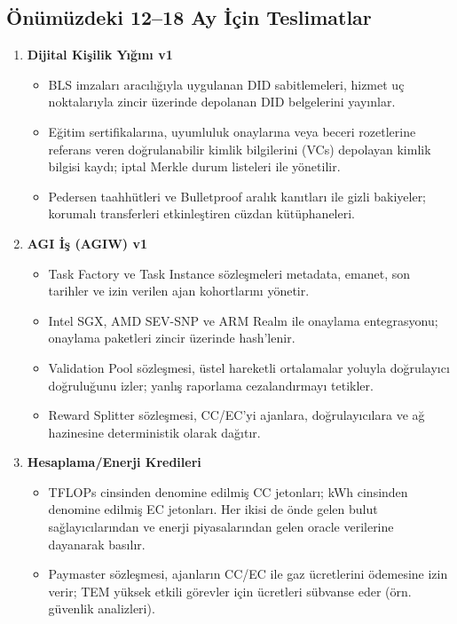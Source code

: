 \documentclass[11pt]{article}
\begin{document}
\subsection{Önümüzdeki 12--18 Ay İçin Teslimatlar}
\begin{enumerate}[label=\textbf{D\arabic*.}, leftmargin=*]
  \item \textbf{Dijital Kişilik Yığını v1}
  \begin{itemize}[noitemsep]
    \item BLS imzaları aracılığıyla uygulanan DID sabitlemeleri, hizmet uç noktalarıyla zincir üzerinde depolanan DID belgelerini yayınlar.
    \item Eğitim sertifikalarına, uyumluluk onaylarına veya beceri rozetlerine referans veren doğrulanabilir kimlik bilgilerini (VCs) depolayan kimlik bilgisi kaydı; iptal Merkle durum listeleri ile yönetilir.
    \item Pedersen taahhütleri ve Bulletproof aralık kanıtları ile gizli bakiyeler; korumalı transferleri etkinleştiren cüzdan kütüphaneleri.
  \end{itemize}
  \item \textbf{AGI İş (AGIW) v1}
  \begin{itemize}[noitemsep]
    \item Task Factory ve Task Instance sözleşmeleri metadata, emanet, son tarihler ve izin verilen ajan kohortlarını yönetir.
    \item Intel SGX, AMD SEV-SNP ve ARM Realm ile onaylama entegrasyonu; onaylama paketleri zincir üzerinde hash'lenir.
    \item Validation Pool sözleşmesi, üstel hareketli ortalamalar yoluyla doğrulayıcı doğruluğunu izler; yanlış raporlama cezalandırmayı tetikler.
    \item Reward Splitter sözleşmesi, CC/EC'yi ajanlara, doğrulayıcılara ve ağ hazinesine deterministik olarak dağıtır.
  \end{itemize}
  \item \textbf{Hesaplama/Enerji Kredileri}
  \begin{itemize}[noitemsep]
    \item TFLOPs cinsinden denomine edilmiş CC jetonları; kWh cinsinden denomine edilmiş EC jetonları. Her ikisi de önde gelen bulut sağlayıcılarından ve enerji piyasalarından gelen oracle verilerine dayanarak basılır.
    \item Paymaster sözleşmesi, ajanların CC/EC ile gaz ücretlerini ödemesine izin verir; TEM yüksek etkili görevler için ücretleri sübvanse eder (örn. güvenlik analizleri).

\end{itemize}
\end{enumerate}
\end{document}
